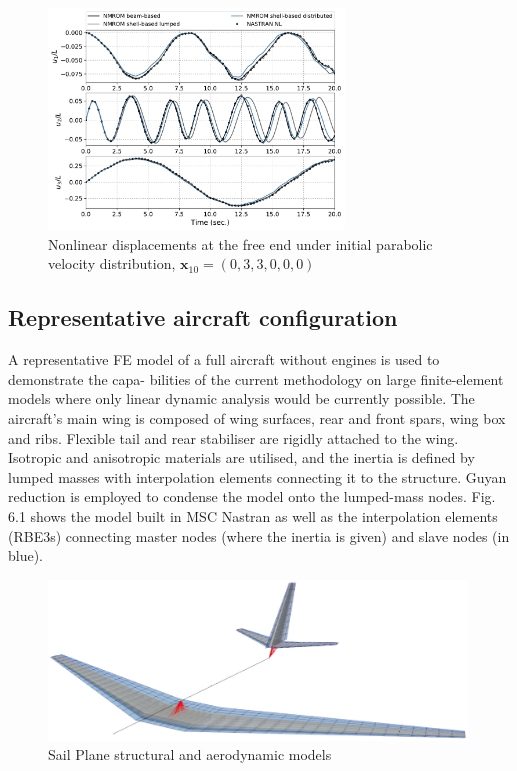 \documentclass[11pt]{article}
\begin{document}
\begin{figure}[h!]
\centering
\includegraphics[width=0.7\textwidth]{./img/cantilever_solnl2}
\caption{Nonlinear displacements at the free end under initial parabolic velocity distribution, $\pmb{x}_{10} = (0,3,3,0,0,0)$}\label{fig:cantilever_solnl}
\end{figure}
%

\subsection{Representative aircraft configuration}
\label{sec:representative_aircraft}
A representative FE model of a full aircraft without engines is used to demonstrate the capa-
bilities of the current methodology on large finite-element models where only linear dynamic
analysis would be currently possible. The aircraft’s main wing is composed of wing surfaces,
rear and front spars, wing box and ribs. Flexible tail and rear stabiliser are rigidly attached to
the wing. Isotropic and anisotropic materials are utilised, and the inertia is defined by lumped
masses with interpolation elements connecting it to the structure. Guyan reduction is employed
to condense the model onto the lumped-mass nodes. Fig. 6.1 shows the model built in MSC
Nastran as well as the interpolation elements (RBE3s) connecting master nodes (where the
inertia is given) and slave nodes (in blue).

\begin{figure}[h!]
\centering
\includegraphics[width=0.99\textwidth]{./img/SailPlane2}
\caption{Sail Plane structural and aerodynamic models}\label{fig:SailPlane}
\end{figure}
\end{document}
